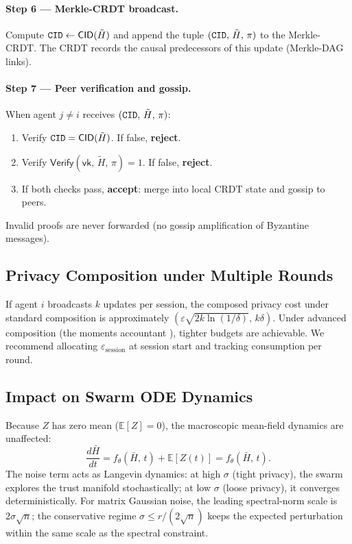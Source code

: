 \paragraph{Step 6 — Merkle-CRDT broadcast.}
Compute $\mathtt{CID} \leftarrow \mathsf{CID}(\tilde{H})$ and append the tuple
$(\mathtt{CID},\, \tilde{H},\, \pi)$ to the Merkle-CRDT.  The CRDT records the causal
predecessors of this update (Merkle-DAG links).

\paragraph{Step 7 — Peer verification and gossip.}
When agent $j \neq i$ receives $(\mathtt{CID},\, \tilde{H},\, \pi)$:
\begin{enumerate}
  \item Verify $\mathtt{CID} = \mathsf{CID}(\tilde{H})$.  If false, \textbf{reject}.
  \item Verify $\mathsf{Verify}(\mathsf{vk},\, \tilde{H},\, \pi) = 1$.
    If false, \textbf{reject}.
  \item If both checks pass, \textbf{accept}: merge into local CRDT state and
    gossip to peers.
\end{enumerate}
Invalid proofs are never forwarded (no gossip amplification of Byzantine messages).

\subsection{Privacy Composition under Multiple Rounds}

If agent $i$ broadcasts $k$ updates per session, the composed privacy cost under
standard composition is approximately $(\varepsilon\sqrt{2k\ln(1/\delta)},\, k\delta)$.
Under advanced composition (the moments accountant \cite{abadi2016moments}), tighter
budgets are achievable.  We recommend allocating $\varepsilon_{\mathrm{session}}$ at
session start and tracking consumption per round.

\subsection{Impact on Swarm ODE Dynamics}

Because $Z$ has zero mean ($\mathbb{E}[Z] = 0$), the macroscopic mean-field dynamics
are unaffected:
\begin{equation}
  \frac{d\bar{H}}{dt} = f_\theta(\bar{H},\, t) + \mathbb{E}[Z(t)] = f_\theta(\bar{H},\, t).
\end{equation}
The noise term acts as Langevin dynamics: at high $\sigma$ (tight privacy), the swarm
explores the trust manifold stochastically; at low $\sigma$ (loose privacy), it converges
deterministically.  For matrix Gaussian noise, the leading spectral-norm scale is
$2\sigma\sqrt{n}$; the conservative regime $\sigma \leq r/(2\sqrt{n})$ keeps the expected
perturbation within the same scale as the spectral constraint.
